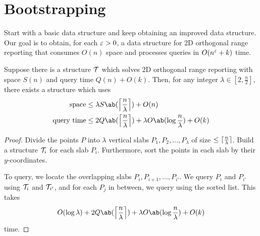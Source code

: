 \section{Bootstrapping} \label{sec:boot}
Start with a basic data structure and keep obtaining an improved data
structure.
Our goal is to obtain, for each $\varepsilon > 0$, a data structure for
2D orthogonal range reporting that consumes $O(n)$ space and processes
queries in $O(n^{\varepsilon} + k)$ time.

\begin{lemma*} \label{thm:boot}
    Suppose there is a structure $\mathcal{T}$ which solves 2D orthogonal range
    reporting with space $S(n)$ and query time $Q(n) + O(k)$.
    Then, for any integer $\lambda \in [2, \frac{n}{2}]$, there exists a
    structure which uses \begin{align*}
        \text{space} &\le \lambda S\ab(\ceil*{\frac n\lambda}) + O(n) \\
        \text{query time} &\le 2 Q\ab(\ceil*{\frac n\lambda})
            + \lambda O\ab(\log\frac n\lambda) + O(k)
    \end{align*}
\end{lemma*}
\begin{proof}
    Divide the points $P$ into $\lambda$ vertical slabs
    $P_1, P_2, \dots, P_\lambda$ of size $\le \lceil\frac{n}{\lambda}\rceil$.
    Build a structure $\mathcal{T}_i$ for each slab $P_i$.
    Furthermore, sort the points in each slab by their $y$-coordinates.

    To query, we locate the overlapping slabs $P_i, P_{i+1}, \dots, P_{i'}$.
    We query $P_i$ and $P_{i'}$ using $\mathcal{T}_i$ and $\mathcal{T}_{i'}$,
    and for each $P_j$ in between, we query using the sorted list.
    This takes \[
        O(\log \lambda) + 2 Q\ab(\ceil*{\frac n\lambda}) +
            \lambda O\ab(\log\frac n\lambda) + O(k)
    \] time.
\end{proof}

